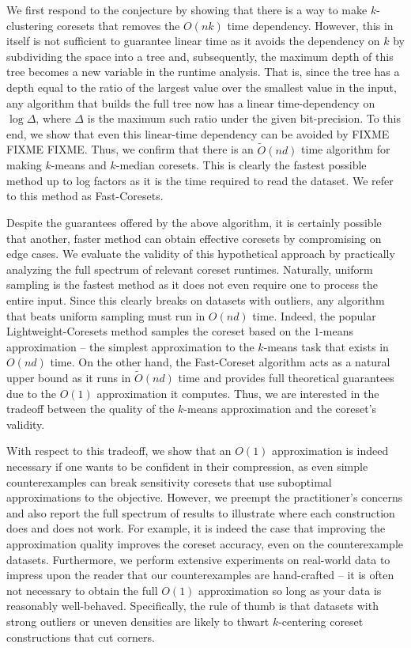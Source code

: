We first respond to the conjecture by showing that there is a way to make $k$-clustering coresets that removes the $O(nk)$ time dependency. However, this in
itself is not sufficient to guarantee linear time as it avoids the dependency on $k$ by subdividing the space into a tree and, subsequently, the
maximum depth of this tree becomes a new variable in the runtime analysis. That is, since the tree has a depth equal to the ratio of the largest value over
the smallest value in the input, any algorithm that builds the full tree now has a linear time-dependency on $\log \Delta$, where $\Delta$ is the maximum
such ratio under the given bit-precision. To this end, we show that even this linear-time dependency can be avoided by FIXME FIXME FIXME. Thus, we
confirm that there is an $\tilde{O}(nd)$ time algorithm for making $k$-means and $k$-median coresets. This is clearly the fastest possible method up to log
factors as it is the time required to read the dataset. We refer to this method as Fast-Coresets.

Despite the guarantees offered by the above algorithm, it is certainly possible that another, faster method can obtain effective coresets by compromising on
edge cases. We evaluate the validity of this hypothetical approach by practically analyzing the full spectrum of relevant coreset runtimes.  Naturally, uniform
sampling is the fastest method as it does not even require one to process the entire input. Since this clearly breaks on datasets with outliers, any algorithm
that beats uniform sampling must run in $O(nd)$ time. Indeed, the popular Lightweight-Coresets method samples the coreset based on the $1$-means approximation
-- the simplest approximation to the $k$-means task that exists in $O(nd)$ time. On the other hand, the Fast-Coreset algorithm acts as a natural upper bound as
it runs in $\tilde{O}(nd)$ time and provides full theoretical guarantees due to the $O(1)$ approximation it computes. Thus, we are interested in the tradeoff
between the quality of the $k$-means approximation and the coreset's validity.

With respect to this tradeoff, we show that an $O(1)$ approximation is indeed necessary if one wants to be confident in their compression, as even simple
counterexamples can break sensitivity coresets that use suboptimal approximations to the objective. However, we preempt the practitioner's concerns and also report
the full spectrum of results to illustrate where each construction does and does not work. For example, it is indeed the case that improving the approximation
quality improves the coreset accuracy, even on the counterexample datasets. Furthermore, we perform extensive experiments on real-world data to impress upon the
reader that our counterexamples are hand-crafted -- it is often not necessary to obtain the full $O(1)$ approximation so long as your data is reasonably
well-behaved. Specifically, the rule of thumb is that datasets with strong outliers or uneven densities are likely to thwart $k$-centering coreset
constructions that cut corners.

